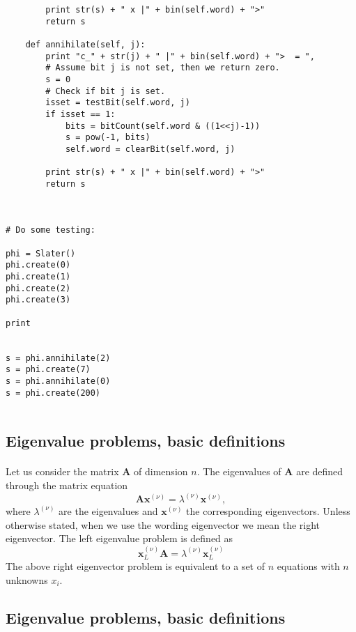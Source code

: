 \begin{verbatim}
        print str(s) + " x |" + bin(self.word) + ">"
        return s
        
    def annihilate(self, j):
        print "c_" + str(j) + " |" + bin(self.word) + ">  = ",
        # Assume bit j is not set, then we return zero.
        s = 0
        # Check if bit j is set.
        isset = testBit(self.word, j)
        if isset == 1:
            bits = bitCount(self.word & ((1<<j)-1))
            s = pow(-1, bits)
            self.word = clearBit(self.word, j)

        print str(s) + " x |" + bin(self.word) + ">"
        return s



# Do some testing:

phi = Slater()
phi.create(0)
phi.create(1)
phi.create(2)
phi.create(3)

print


s = phi.annihilate(2)
s = phi.create(7)
s = phi.annihilate(0)
s = phi.create(200)


\end{verbatim}

    

\subsection*{Eigenvalue problems, basic definitions}

\paragraph{}
Let us consider the matrix $\mathbf{A}$ of dimension $n$. The eigenvalues of
$\mathbf{A}$ are defined through the matrix equation 
\[
   \mathbf{A}\mathbf{x}^{(\nu)} = \lambda^{(\nu)}\mathbf{x}^{(\nu)},
\]
where $\lambda^{(\nu)}$ are the eigenvalues and $\mathbf{x}^{(\nu)}$ the
corresponding eigenvectors.
Unless otherwise stated, when we use the wording eigenvector we mean the
right eigenvector. The left eigenvalue problem is defined as 
\[
\mathbf{x}^{(\nu)}_L\mathbf{A} = \lambda^{(\nu)}\mathbf{x}^{(\nu)}_L
\]
The above right eigenvector problem is equivalent to a set of $n$ equations with $n$ unknowns
$x_i$.



\subsection*{Eigenvalue problems, basic definitions}

